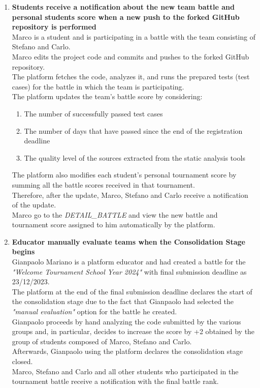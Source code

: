 \begin{enumerate}
	\item \textbf{Students receive a notification about the new team battle and personal students score when a new push to the forked GitHub repository is performed}\\
	      Marco is a student and is participating in a battle with the team consisting of Stefano and Carlo.\\
	      Marco edits the project code and commits and pushes to the forked GitHub repository. \\
	      The platform fetches the code, analyzes it, and runs the prepared tests (test cases) for the battle in which the team is participating.\\
	      The platform updates the team's battle score by considering:
	      \begin{enumerate}
		      \item The number of successfully passed test cases
		      \item The number of days that have passed since the end of the registration deadline
		      \item The quality level of the sources extracted from the static analysis tools
	      \end{enumerate}
	      The platform also modifies each student's personal tournament score by summing all the battle scores received in that tournament.\\
	      Therefore, after the update, Marco, Stefano and Carlo receive a notification of the update.\\
		  Marco go to the \emph{DETAIL\_BATTLE} and view the new battle and tournament score assigned to him automatically by the platform.\\





	\item \textbf{Educator manually evaluate teams when the Consolidation Stage begins}\\
	      Gianpaolo Mariano is a platform educator and had created a battle for the \emph{"Welcome Tournament School Year 2024"} with final submission deadline as 23/12/2023.\\
	      The platform at the end of the final submission deadline declares the start of the consolidation stage due to the fact that Gianpaolo had selected the \emph{"manual evaluation"} option for the battle he created.\\
	      Gianpaolo proceeds by hand analyzing the code submitted by the various groups and, in particular, decides to increase the score by +2 obtained by the group of students composed of Marco, Stefano and Carlo.\\
	      Afterwards, Gianpaolo using the platform declares the consolidation stage closed.\\
	      Marco, Stefano and Carlo and all other students who participated in the tournament battle receive a notification with the final battle rank.



\end{enumerate}
